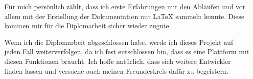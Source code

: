 Für mich persönlich zählt, dass ich erste Erfahrungen mit den Abläufen und
vor allem mit der Erstellung der Dokumentation mit LaTeX sammeln
konnte. Diese kommen mir für die Diplomarbeit sicher wieder zugute.

Wenn ich die Diplomarbeit abgeschlossen habe, werde ich dieses 
Projekt auf jeden Fall weiterverfolgen, da ich fest entschlossen bin, dass es
eine Plattform mit diesen Funktionen braucht. Ich hoffe natürlich, dass sich weitere
Entwickler finden lassen und versuche auch meinen Freundeskreis dafür zu begeistern.